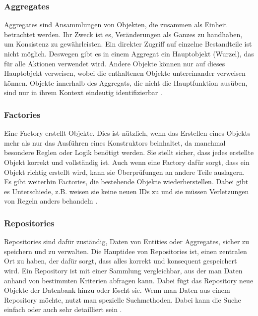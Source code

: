 {\subsubsection{Aggregates}

\glqq Aggregates\grqq{} sind Ansammlungen von Objekten, die zusammen als Einheit betrachtet werden. Ihr Zweck ist es, Veränderungen als Ganzes zu handhaben, um Konsistenz zu gewährleisten. Ein direkter Zugriff auf einzelne Bestandteile ist nicht möglich. Deswegen gibt es in einem Aggregat ein Hauptobjekt (Wurzel), das für alle Aktionen verwendet wird. Andere Objekte können nur auf dieses Hauptobjekt verweisen, wobei die enthaltenen Objekte untereinander verweisen können. Objekte innerhalb des Aggregats, die nicht die Hauptfunktion ausüben, sind nur in ihrem Kontext eindeutig identifizierbar \cite[S. 123 - 135]{evans} \cite[S.76]{daschner}.

\subsubsection{Factories}

Eine \glqq Factory\grqq{} erstellt Objekte. Dies ist nützlich, wenn das Erstellen eines Objekts mehr als nur das Ausführen eines Konstruktors beinhaltet, da manchmal besondere Reglen oder Logik benötigt werden. Sie stellt sicher, dass jedes erstellte Objekt korrekt und vollständig ist. Auch wenn eine Factory dafür sorgt, dass ein Objekt richtig erstellt wird, kann sie Überprüfungen an andere Teile auslagern. Es gibt weiterhin Factories, die bestehende Objekte wiederherstellen. Dabei gibt es Unterschiede, z.B. weisen sie keine neuen IDs zu und sie müssen Verletzungen von Regeln anders behandeln \cite[S. 136 - 146]{evans} \cite[S.77]{daschner}.

\subsubsection{Repositories}

\glqq Repositories\grqq{} sind dafür zuständig, Daten von Entities oder Aggregates, sicher zu speichern und zu verwalten. Die Hauptidee von Repositories ist, einen zentralen Ort zu haben, der dafür sorgt, dass alles korrekt und konsequent gespeichert wird. Ein Repository ist mit einer Sammlung vergleichbar, aus der man Daten anhand von bestimmten Kriterien abfragen kann. Dabei fügt das Repository neue Objekte der Datenbank hinzu oder löscht sie. Wenn man Daten aus einem Repository möchte, nutzt man spezielle Suchmethoden. Dabei kann die Suche einfach oder auch sehr detailliert sein \cite[S. 147 - 161]{evans} \cite[S.76]{daschner}.

}
